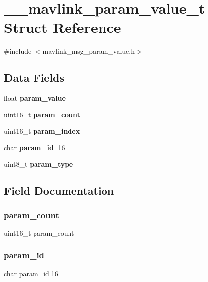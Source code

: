\section{\+\_\+\+\_\+mavlink\+\_\+param\+\_\+value\+\_\+t Struct Reference}
\label{struct____mavlink__param__value__t}


{\ttfamily \#include $<$mavlink\+\_\+msg\+\_\+param\+\_\+value.\+h$>$}

\subsection*{Data Fields}
\begin{DoxyCompactItemize}
\item 
float \textbf{ param\+\_\+value}
\item 
uint16\+\_\+t \textbf{ param\+\_\+count}
\item 
uint16\+\_\+t \textbf{ param\+\_\+index}
\item 
char \textbf{ param\+\_\+id} [16]
\item 
uint8\+\_\+t \textbf{ param\+\_\+type}
\end{DoxyCompactItemize}


\subsection{Field Documentation}
\mbox{\label{struct____mavlink__param__value__t_a798b61078625a32a5a019dc10fbf86e3}} 
\subsubsection{param\+\_\+count}
{\footnotesize\ttfamily uint16\+\_\+t param\+\_\+count}

\mbox{\label{struct____mavlink__param__value__t_a3167e09cdc92f9b6981b87379d5fd336}} 
\subsubsection{param\+\_\+id}
{\footnotesize\ttfamily char param\+\_\+id[16]}

